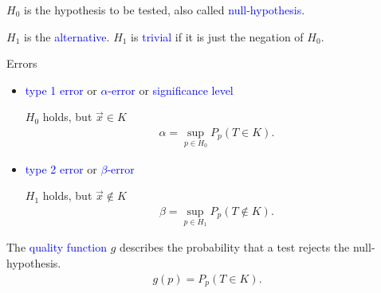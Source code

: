 \documentclass{beamer}
\def\padding{\vspace{0.5cm}}
\def\b{\textcolor{blue}}
\begin{document}
\begin{frame}
    $H_0$ is the hypothesis to be tested, also called \b{null-hypothesis}.\par
    $H_1$ is the \b{alternative}. $H_1$ is \b{trivial} if it is just the negation of $H_0$.\pause\par\padding
    \begin{block}{Errors}
        \begin{itemize}
            \item \b{type 1 error} or \b{$\alpha$-error} or \b{significance level}\par
                $H_0$ holds, but $\overrightarrow{x} \in K$
                \begin{align*}
                    \alpha = \sup_{p \in H_0} P_p(T \in K).
                \end{align*}\pause
            \item \b{type 2 error} or \b{$\beta$-error}\par
                $H_1$ holds, but $\overrightarrow{x} \not\in K$
                \begin{align*}
                    \beta = \sup_{p \in H_1} P_p(T \not\in K).
                \end{align*}
        \end{itemize}
    \end{block}
\end{frame}

\begin{frame}
    The \b{quality function} $g$ describes the probability that a test rejects the null-hypothesis.
    \begin{align*}
        g(p) = P_p(T \in K).
    \end{align*}
\end{frame}
\end{document}
